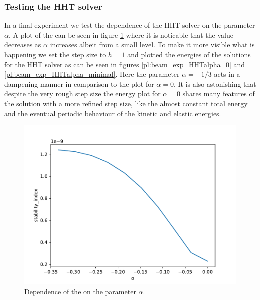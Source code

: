 \documentclass{report}
\newcounter{constant}
\begin{document}
\subsubsection*{Testing the HHT solver}

In a final experiment we test the dependence of the HHT solver on the parameter $\alpha$. A plot of the  can be seen in figure \ref{pl:beam_exp_HHTalpha} where it is noticable that the value decreases as $\alpha$ increases albeit from a small level. To make it more visible what is happening we set the step size to $h=1$ and plotted the energies of the solutions for the HHT solver as can be seen in figures \ref{pl:beam_exp_HHTalpha_0} and \ref{pl:beam_exp_HHTalpha_minimal}. Here the parameter $\alpha=-1/3$ acts in a dampening manner in comparison to the plot for $\alpha=0$. It is also astonishing that despite the very rough step size the energy plot for $\alpha=0$ shares many features of the solution with a more refined step size, like the almost constant total energy and the eventual periodic behaviour of the kinetic and elastic energies.

\begin{figure}[h]
\centering
\begin{minipage}[t]{0.45\textwidth}
\centering
\includegraphics[width=\textwidth]{../Plots/Project3_main/Figure_920.pdf}
\caption{Dependence of the  on the parameter $\alpha$.}
\label{pl:beam_exp_HHTalpha}
\end{minipage}
\end{figure}
\end{document}
